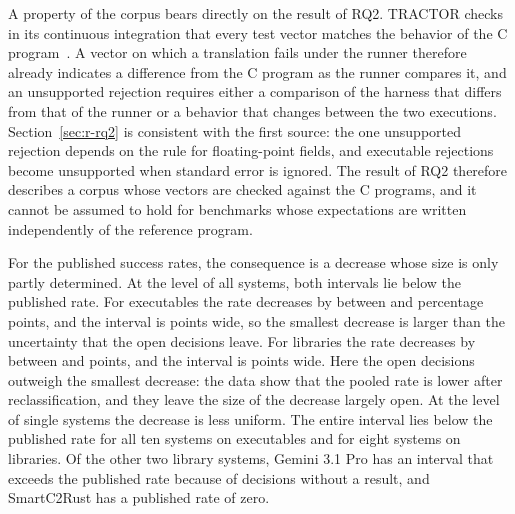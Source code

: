 A property of the corpus bears directly on the result of RQ2. TRACTOR checks in its continuous integration that every test vector matches the behavior of the C program~\cite{okhravi2026tractorbenchmark}. A vector on which a translation fails under the runner therefore already indicates a difference from the C program as the runner compares it, and an unsupported rejection requires either a comparison of the harness that differs from that of the runner or a behavior that changes between the two executions. Section~\ref{sec:r-rq2} is consistent with the first source: the one unsupported rejection depends on the rule for floating-point fields, and \rqRobFFNoStderrExeAllNum{} executable rejections become unsupported when standard error is ignored. The result of RQ2 therefore describes a corpus whose vectors are checked against the C programs, and it cannot be assumed to hold for benchmarks whose expectations are written independently of the reference program.

For the published success rates, the consequence is a decrease whose size is only partly determined. At the level of all systems, both intervals lie below the published rate. For executables the rate decreases by between \rqSRDecrMinExeAllPct{} and \rqSRDecrMaxExeAllPct{} percentage points, and the interval is \widthE{} points wide, so the smallest decrease is larger than the uncertainty that the open decisions leave. For libraries the rate decreases by between \rqSRDecrMinLibAllPct{} and \rqSRDecrMaxLibAllPct{} points, and the interval is \rqSRWidthTightLibAllPct{} points wide. Here the open decisions outweigh the smallest decrease: the data show that the pooled rate is lower after reclassification, and they leave the size of the decrease largely open. At the level of single systems the decrease is less uniform. The entire interval lies below the published rate for all ten systems on executables and for eight systems on libraries. Of the other two library systems, Gemini 3.1 Pro has an interval that exceeds the published rate because of decisions without a result, and SmartC2Rust has a published rate of zero.

